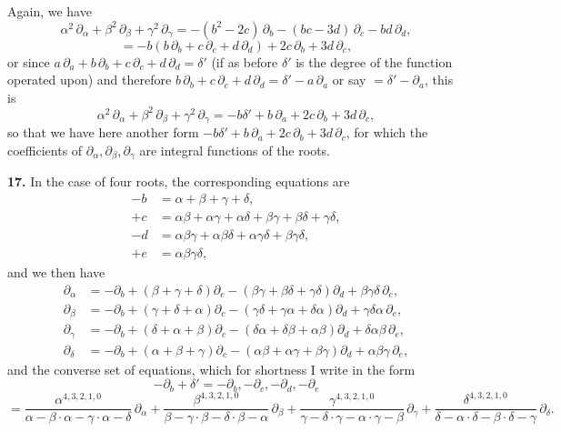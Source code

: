 \documentclass[11pt]{article}
\begin{document}
Again, we have
\[
\alpha^2\,\partial_\alpha + \beta^2\,\partial_\beta + \gamma^2\,\partial_\gamma = -(b^2 - 2c)\,\partial_b - (bc - 3d)\,\partial_c - bd\,\partial_d,
\]
\[
= -b(b\,\partial_b + c\,\partial_c + d\,\partial_d) + 2c\,\partial_b + 3d\,\partial_c,
\]
or since $a\,\partial_a + b\,\partial_b + c\,\partial_c + d\,\partial_d = \delta'$ (if as before $\delta'$ is the degree of the function operated upon) and therefore $b\,\partial_b + c\,\partial_c + d\,\partial_d = \delta' - a\,\partial_a$ or say $= \delta' - \partial_a$, this is
\[
\alpha^2\,\partial_\alpha + \beta^2\,\partial_\beta + \gamma^2\,\partial_\gamma = -b\delta' + b\,\partial_a + 2c\,\partial_b + 3d\,\partial_c,
\]
so that we have here another form $-b\delta' + b\,\partial_a + 2c\,\partial_b + 3d\,\partial_c$, for which the coefficients of $\partial_\alpha, \partial_\beta, \partial_\gamma$ are integral functions of the roots.

\textbf{17.} In the case of four roots, the corresponding equations are
\begin{align*}
-b &= \alpha + \beta + \gamma + \delta,\\
+c &= \alpha\beta + \alpha\gamma + \alpha\delta + \beta\gamma + \beta\delta + \gamma\delta,\\
-d &= \alpha\beta\gamma + \alpha\beta\delta + \alpha\gamma\delta + \beta\gamma\delta,\\
+e &= \alpha\beta\gamma\delta,
\end{align*}
and we then have
\begin{align*}
\partial_\alpha &= -\partial_b + (\beta + \gamma + \delta)\partial_c - (\beta\gamma + \beta\delta + \gamma\delta)\partial_d + \beta\gamma\delta\,\partial_e,\\
\partial_\beta &= -\partial_b + (\gamma + \delta + \alpha)\partial_c - (\gamma\delta + \gamma\alpha + \delta\alpha)\partial_d + \gamma\delta\alpha\,\partial_e,\\
\partial_\gamma &= -\partial_b + (\delta + \alpha + \beta)\partial_c - (\delta\alpha + \delta\beta + \alpha\beta)\partial_d + \delta\alpha\beta\,\partial_e,\\
\partial_\delta &= -\partial_b + (\alpha + \beta + \gamma)\partial_c - (\alpha\beta + \alpha\gamma + \beta\gamma)\partial_d + \alpha\beta\gamma\,\partial_e,
\end{align*}
and the converse set of equations, which for shortness I write in the form
\[
-\partial_b + \delta' = -\partial_b, -\partial_c, -\partial_d, -\partial_e
\]
\[
= \frac{\alpha^{4,3,2,1,0}}{\alpha-\beta\cdot\alpha-\gamma\cdot\alpha-\delta}\,\partial_\alpha + \frac{\beta^{4,3,2,1,0}}{\beta-\gamma\cdot\beta-\delta\cdot\beta-\alpha}\,\partial_\beta + \frac{\gamma^{4,3,2,1,0}}{\gamma-\delta\cdot\gamma-\alpha\cdot\gamma-\beta}\,\partial_\gamma + \frac{\delta^{4,3,2,1,0}}{\delta-\alpha\cdot\delta-\beta\cdot\delta-\gamma}\,\partial_\delta.
\]
\end{document}

